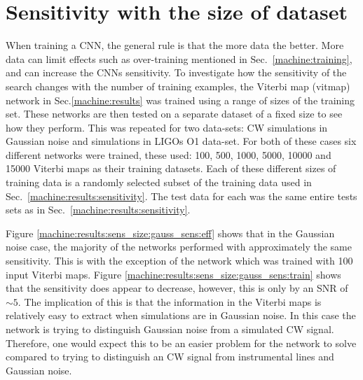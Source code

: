 \clearpage

\section{\label{machine:results:sens_size} Sensitivity with the size of dataset}

When training a \gls{CNN}, the general rule is that the more data the better. 
More data can limit effects such as over-training mentioned in Sec.~\ref{machine:training}, and can increase the \glspl{CNN} sensitivity.
To investigate how the sensitivity of the search changes with the number of training examples, the Viterbi map (vitmap) network in Sec.\ref{machine:results} was trained using a range of sizes of the training set. 
These networks are then tested on a separate dataset of a fixed size to see how they perform.
This was repeated for two data-sets: \gls{CW} simulations in Gaussian noise and simulations in \glspl{LIGO} O1 data-set. 
For both of these cases six different networks were trained, these used: 100, 500, 1000, 5000, 10000 and 15000 Viterbi maps as their training datasets.
Each of these different sizes of training data is a randomly selected subset of the training data used in Sec.~\ref{machine:results:sensitivity}.
The test data for each was the same entire tests sets as in Sec.~\ref{machine:results:sensitivity}.

Figure \ref{machine:results:sens_size:gauss_sens:eff} shows that in the Gaussian noise case, the majority of the networks performed with approximately the same sensitivity. 
This is with the exception of the network which was trained with 100 input Viterbi maps. 
Figure \ref{machine:results:sens_size:gauss_sens:train} shows that the sensitivity does appear to decrease, however, this is only by an \gls{SNR} of $\sim 5$.
The implication of this is that the information in the Viterbi maps is relatively easy to extract when simulations are in Gaussian noise. 
In this case the network is trying to distinguish Gaussian noise from a simulated \gls{CW} signal.
Therefore, one would expect this to be an easier problem for the network to solve compared to trying to distinguish an \gls{CW} signal from instrumental lines and Gaussian noise. 

